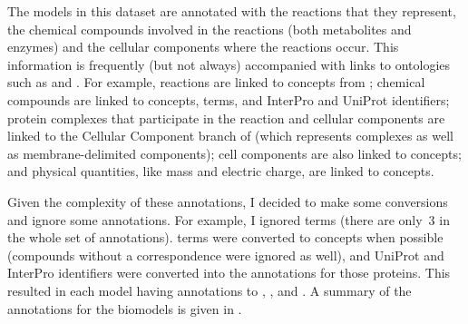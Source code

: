 
The models in this dataset are annotated with the reactions that they represent, the chemical compounds involved in the reactions (both metabolites and enzymes) and the cellular components where the reactions occur. This information is frequently (but not always) accompanied with links to ontologies such as  and . For example, reactions are linked to concepts from ; chemical compounds are linked to  concepts,  terms, and InterPro and UniProt identifiers; protein complexes that participate in the reaction and cellular components are linked to the Cellular Component branch of  (which represents complexes as well as membrane-delimited components); cell components are also linked to  concepts; and physical quantities, like mass and electric charge, are linked to  concepts.

Given the complexity of these annotations, I decided to make some conversions and ignore some annotations. For example, I ignored  terms (there are only~$3$ in the whole set of annotations).  terms were converted to  concepts when possible (compounds without a correspondence were ignored as well), and UniProt and InterPro identifiers were converted into the  annotations for those proteins. This resulted in each model having annotations to , ,  and . A summary of the annotations for the biomodels is given in .

